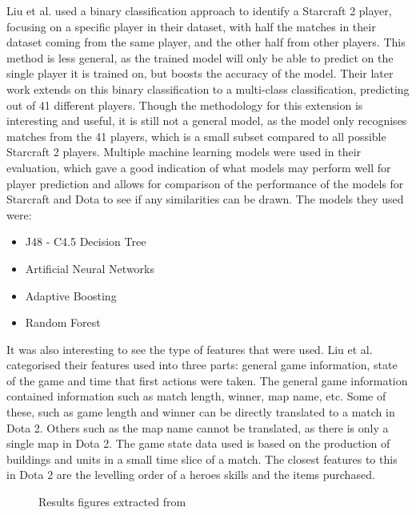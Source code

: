 \documentclass[Report.tex]{subfiles}
\begin{document}
Liu et al. \cite{starcraft-identification} used a binary classification approach to identify a Starcraft 2 player, focusing on a specific player in their dataset, with half the matches in their dataset coming from the same player, and the other half from other players. This method is less general, as the trained model will only be able to predict on the single player it is trained on, but boosts the accuracy of the model. Their later work \cite{starcraft-actions} extends on this binary classification to a multi-class classification, predicting out of 41 different players. Though the methodology for this extension is interesting and useful, it is still not a general model, as the model only recognises matches from the 41 players, which is a small subset compared to all possible Starcraft 2 players. Multiple machine learning models were used in their evaluation, which gave a good indication of what models may perform well for player prediction and allows for comparison of the performance of the models for Starcraft and Dota to see if any similarities can be drawn. The models they used were:
\begin{itemize}
\item J48 - C4.5 Decision Tree
\item Artificial Neural Networks
\item Adaptive Boosting
\item Random Forest
\end{itemize}
It was also interesting to see the type of features that were used. Liu et al. categorised their features used into three parts: general game information, state of the game and time that first actions were taken. The general game information contained information such as match length, winner, map name, etc. Some of these, such as game length and winner can be directly translated to a match in Dota 2. Others such as the map name cannot be translated, as there is only a single map in Dota 2. The game state data used is based on the production of buildings and units in a small time slice of a match. The closest features to this in Dota 2 are the levelling order of a heroes skills and the items purchased. 

\begin{figure}[H]
\centering
\begin{subfigure}{0.45\textwidth}
\end{subfigure}
\hspace{\fill}
\begin{subfigure}{0.45\textwidth}
\end{subfigure}
\caption{Results figures extracted from \cite{starcraft-identification}}
\end{figure}
\end{document}
